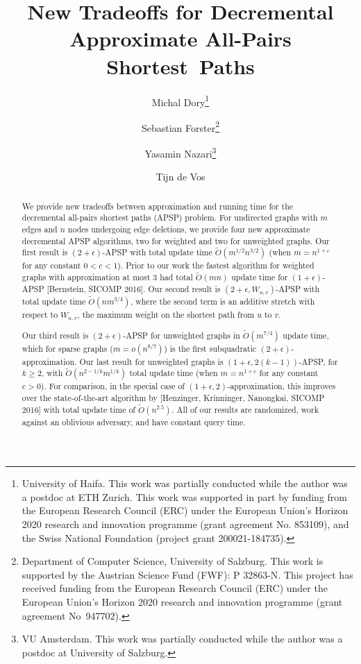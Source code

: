 \documentclass[11pt]{article}
\title{New Tradeoffs for Decremental Approximate All-Pairs Shortest~Paths}
\author{Michal Dory\thanks{University of Haifa. This work was partially conducted while the author was a postdoc at ETH Zurich. This work was supported in part by funding from the European Research Council (ERC) under the European Union’s Horizon 2020 research and innovation programme (grant agreement No. 853109), and the Swiss National Foundation (project grant 200021-184735).} \and  Sebastian Forster\thanks{Department of Computer Science, University of Salzburg. This work is supported by the Austrian Science Fund (FWF): P 32863-N. This project has received funding from the European Research Council (ERC) under the European Union's Horizon 2020 research and innovation programme (grant agreement No~947702).} \and Yasamin Nazari\thanks{VU Amsterdam. This work was partially conducted while the author was a postdoc at University of Salzburg.} \and Tijn de Vos\samethanks[2]}
\date{}
\theoremstyle{definition}
\theoremstyle{remark}
\begin{document}
\begin{titlepage}
\maketitle
\begin{abstract}
    We provide new tradeoffs between approximation and running time for the decremental all-pairs shortest paths (APSP) problem. For undirected graphs with $m$ edges and $n$ nodes undergoing edge deletions, we provide four new approximate decremental APSP algorithms, two for weighted and two for unweighted graphs. 
Our first result is $(2+ \epsilon)$-APSP with total update time $\tilde{O}(m^{1/2}n^{3/2})$ (when $m= n^{1+c}$ for any constant $0<c<1$).
Prior to our work the fastest algorithm for weighted graphs with approximation at most $3$ had total $\tilde O(mn)$ update time for $(1+\epsilon)$-APSP [Bernstein, SICOMP 2016]. 
Our second result is  $(2+\epsilon, W_{u,v})$-APSP with total update time $\tilde{O}(nm^{3/4})$, where the second term is an additive stretch with respect to $W_{u,v}$, the maximum weight on the shortest path from $u$ to $v$.  

Our third result is $(2+ \epsilon)$-APSP for unweighted graphs in $\tilde O(m^{7/4})$ update time, which for sparse graphs ($m=o(n^{8/7})$) is the first subquadratic $(2+\epsilon)$-approximation.
Our last result for unweighted graphs is $(1+\epsilon, 2(k-1))$-APSP, for $k \geq 2 $, with $\tilde{O}(n^{2-1/k}m^{1/k})$ total update time (when $m=n^{1+c}$ for any constant $c >0$). 
For comparison, in the special case of $(1+\epsilon, 2)$-approximation, this improves over the state-of-the-art algorithm by [Henzinger, Krinninger, Nanongkai, SICOMP 2016] with total update time of $\tilde{O}(n^{2.5})$.
All of our results are randomized, work against an oblivious adversary, and have constant query time. 

\end{abstract}

\thispagestyle{empty}
\newpage

\tableofcontents
\thispagestyle{empty}

\newpage


\end{titlepage}
\end{document}
